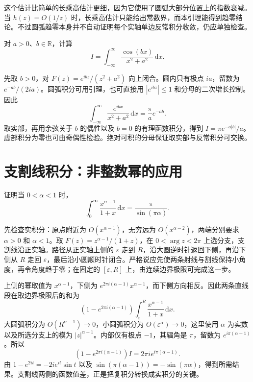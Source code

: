 \documentclass[UTF8,12pt,a4paper,fontset=fandol]{ctexbook}
\begin{document}
这个估计比简单的长乘高估计更细，因为它使用了圆弧大部分位置上的指数衰减。当 $h(z)=O(1/z)$ 时，长乘高估计只能给出常数界，而本引理能得到趋零结论。不过圆弧趋零本身并不自动证明每个实轴单边反常积分收敛，仍应单独检查。

\begin{example}[余弦变换型积分]
对 $a>0$、$b\in\mathbb R$，计算
\[
 I=\int_{-\infty}^{\infty}\frac{\cos(bx)}{x^2+a^2}\,\mathrm dx.
\]
\end{example}
\begin{solve}
先取 $b>0$，对 $F(z)=e^{ibz}/(z^2+a^2)$ 向上闭合。圆内只有极点 $ia$，留数为 $e^{-ab}/(2ia)$。圆弧积分可用引理，也可直接用 $|e^{ibz}|\le1$ 和分母的二次增长控制。因此
\[
 \int_{-\infty}^{\infty}\frac{e^{ibx}}{x^2+a^2}\,\mathrm dx
 =\frac\pi a e^{-ab}.
\]
取实部，再用余弦关于 $b$ 的偶性以及 $b=0$ 的有理函数积分，得到 $I=\pi e^{-a|b|}/a$。虚部积分为零也可由奇偶性检验。绝对可积的分母保证取实部与反常积分可交换。
\end{solve}

\section{支割线积分：非整数幂的应用}

\begin{example}[钥匙孔路径]
\label{ex:cv-keyhole}
证明当 $0<\alpha<1$ 时，
\begin{equation}
 \int_0^\infty\frac{x^{\alpha-1}}{1+x}\,\mathrm dx
 =\frac\pi{\sin(\pi\alpha)}.
 \label{eq:cv-keyhole-integral}
\end{equation}
\end{example}
\begin{solve}
先检查实积分：原点附近为 $O(x^{\alpha-1})$，无穷远为 $O(x^{\alpha-2})$，两端分别要求 $\alpha>0$ 和 $\alpha<1$。取 $F(z)=z^{\alpha-1}/(1+z)$，在 $0<\arg z<2\pi$ 上选分支，支割线沿正实轴。路径从正实轴上侧的 $\varepsilon$ 走到 $R$，沿大圆逆时针返回下侧，再沿下侧从 $R$ 走回 $\varepsilon$，最后沿小圆顺时针闭合。严格说应先使两条射线与割线保持小角度，再令角度趋于零；在固定的 $[\varepsilon,R]$ 上，由连续边界极限可完成这一步。

上侧的幂取值为 $x^{\alpha-1}$，下侧为 $e^{2\pi i(\alpha-1)}x^{\alpha-1}$，而下侧方向相反。因此两条直线段在取边界极限后的和为
\[
 \left(1-e^{2\pi i(\alpha-1)}\right)
 \int_\varepsilon^R\frac{x^{\alpha-1}}{1+x}\,\mathrm dx.
\]
大圆弧积分为 $O(R^{\alpha-1})\to0$，小圆弧积分为 $O(\varepsilon^\alpha)\to0$，这里使用 $\alpha$ 为实数以及所选分支上的模为 $|z|^{\alpha-1}$。内部仅有极点 $-1$，其辐角是 $\pi$，留数为 $e^{i\pi(\alpha-1)}$。所以
\[
 \left(1-e^{2\pi i(\alpha-1)}\right)I
 =2\pi i e^{i\pi(\alpha-1)}.
\]
由 $1-e^{2it}=-2ie^{it}\sin t$ 以及 $\sin(\pi(\alpha-1))=-\sin(\pi\alpha)$，得到所需结果。支割线两侧的函数值差，正是把复积分转换成实积分的关键。
\end{solve}
\end{document}
